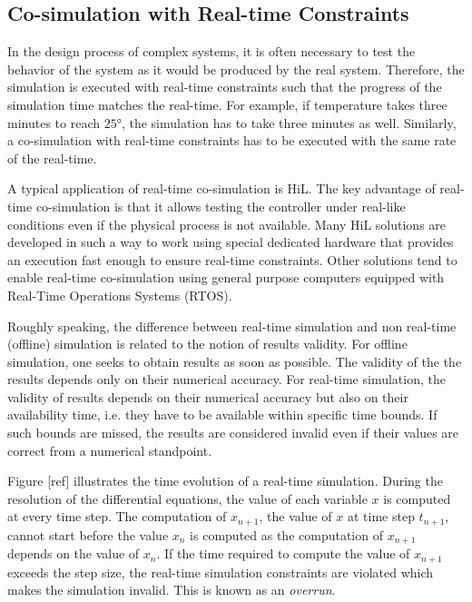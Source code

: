 \subsection{Co-simulation with Real-time Constraints}

In the design process of complex systems, it is often necessary to test the behavior of the system as it would be produced by the real system. Therefore, the simulation is executed with real-time constraints such that the progress of the simulation time matches the real-time. For example, if temperature takes three minutes to reach $25$°, the simulation has to take three minutes as well. Similarly, a co-simulation with real-time constraints has to be executed with the same rate of the real-time.

A typical application of real-time co-simulation is HiL. The key advantage of real-time co-simulation is that it allows testing the controller under real-like conditions even if the physical process is not available. Many HiL solutions are developed in such a way to work using special dedicated hardware that provides an execution fast enough to ensure real-time constraints. Other solutions tend to enable real-time co-simulation using general purpose computers equipped with Real-Time Operations Systems (RTOS).

Roughly speaking, the difference between real-time simulation and non real-time (offline) simulation is related to the notion of results validity. For offline simulation, one seeks to obtain results as soon as possible. The validity of the the results depends only on their numerical accuracy. For real-time simulation, the validity of results depends on their numerical accuracy but also on their availability time, i.e. they have to be available within specific time bounds. If such bounds are missed, the results are considered invalid even if their values are correct from a numerical standpoint.

Figure [ref] illustrates the time evolution of a real-time simulation. During the resolution of the differential equations, the value of each variable $x$ is computed at every time step. The computation of $x_{n+1}$, the value of $x$ at time step $t_{n+1}$, cannot start before the value $x_n$ is computed as the computation of $x_{n+1}$ depends on the value of $x_n$. If the time required to compute the value of $x_{n+1}$ exceeds the step size, the real-time simulation constraints are violated which makes the simulation invalid. This is known as an \textit{overrun}.

